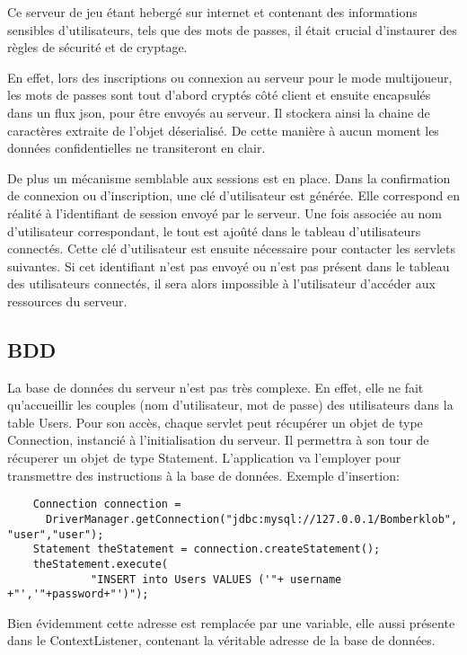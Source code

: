		Ce serveur de jeu étant hebergé sur internet et contenant des informations
		sensibles d'utilisateurs, tels que des mots de passes, il était crucial
		d'instaurer des règles de sécurité et de cryptage. 
		
		En effet, lors des inscriptions ou connexion au serveur pour le mode
		multijoueur, les mots de passes sont tout d'abord cryptés côté client et
		ensuite encapsulés dans un flux \gls{json}, pour être envoyés au serveur. Il
		stockera ainsi la chaine de caractères extraite de l'objet déserialisé. De cette
		manière à aucun moment les données confidentielles ne transiteront en clair.
		
		De plus un mécanisme semblable aux sessions est en place. Dans la
		confirmation de connexion ou d'inscription, une clé d'utilisateur est générée. Elle correspond en
		réalité à l'identifiant de session envoyé par le serveur. Une fois associée
		au nom d'utilisateur correspondant, le tout est ajoûté dans le tableau
		d'utilisateurs connectés.
		Cette clé d'utilisateur est ensuite nécessaire pour contacter les \glspl{servlet}
		suivantes. Si cet identifiant n'est pas envoyé ou n'est pas présent dans le tableau des
		utilisateurs connectés, il sera alors impossible à l'utilisateur d'accéder aux
		ressources du serveur.
		
\subsection{BDD}

	La base de données du serveur n'est pas très complexe. En effet, elle ne fait
	qu'accueillir les couples (nom d'utilisateur, mot de passe) des utilisateurs dans
	la table Users. 
	Pour son accès, chaque \gls{servlet} peut récupérer un objet de type
	Connection, instancié à l'initialisation du serveur. Il permettra à son tour
	de récuperer un objet de type Statement. L'application va l'employer pour
	transmettre des instructions à la base de données.
	Exemple d'insertion: 
		
	\begin{verbatim}
	Connection connection = 
	  DriverManager.getConnection("jdbc:mysql://127.0.0.1/Bomberklob", "user","user");
	Statement theStatement = connection.createStatement();
	theStatement.execute(
		     "INSERT into Users VALUES ('"+ username +"','"+password+"')");
	\end{verbatim}
	
	Bien évidemment cette adresse est remplacée par une variable, elle aussi
	présente dans le ContextListener, contenant la véritable adresse de la base de
	données.
	
	
	
	
